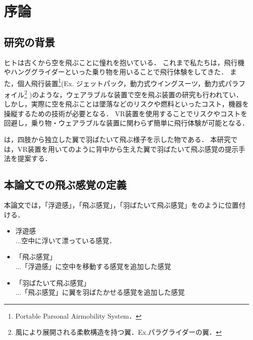 \chapter[序論]%
        {序論}
\section{研究の背景}


        ヒトは古くから空を飛ぶことに憧れを抱いている．
        これまで私たちは，飛行機やハンググライダーといった乗り物を用いることで飛行体験をしてきた．
        また，個人飛行装置\footnote{Portable Parsonal Airmobility System．}(Ex. ジェットパック，動力式ウイングスーツ，動力式パラフォイル\footnote{風により展開される柔軟構造を持つ翼．Ex.パラグライダーの翼．}
        )のような，ウェアラブルな装置で空を飛ぶ装置の研究も行われてい\cite{gravityindustries}．
        しかし，実際に空を飛ぶことは墜落などのリスクや燃料といったコスト，機器を操縦するための技術が必要となる．
        VR装置を使用することでリスクやコストを回避し，乗り物・ウェアラブルな装置に関わらず簡単に飛行体験が可能となる．

        は，四肢から独立した翼で羽ばたいて飛ぶ様子を示した物である．
        本研究では，VR装置を用いてのように背中から生えた翼で羽ばたいて飛ぶ感覚の提示手法を提案する．

\section{本論文での飛ぶ感覚の定義}
        本論文では，「浮遊感」，「飛ぶ感覚」，「羽ばたいて飛ぶ感覚」をのように位置付ける．

        \begin{itemize}
                \item 浮遊感\\
                ...空中に浮いて漂っている感覚．
                \item 「飛ぶ感覚」\\
                ...「浮遊感」に空中を移動する感覚を追加した感覚
                \item 「羽ばたいて飛ぶ感覚」\\
                ...「飛ぶ感覚」に翼を羽ばたかせる感覚を追加した感覚
        \end{itemize}

